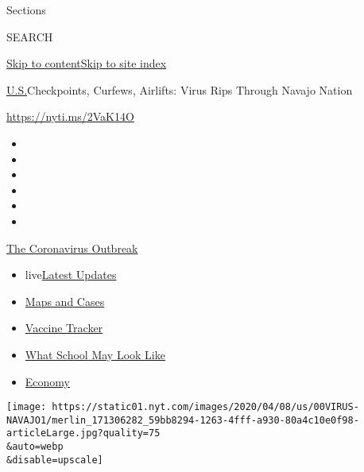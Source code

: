 Sections

SEARCH

\protect\hyperlink{site-content}{Skip to
content}\protect\hyperlink{site-index}{Skip to site index}

\href{/section/us}{U.S.}\textbar{}Checkpoints, Curfews, Airlifts: Virus
Rips Through Navajo Nation

\url{https://nyti.ms/2VaK14O}

\begin{itemize}
\item
\item
\item
\item
\item
\item
\end{itemize}

\href{https://www.nytimes.com/news-event/coronavirus?action=click\&pgtype=Article\&state=default\&region=TOP_BANNER\&context=storylines_menu}{The
Coronavirus Outbreak}

\begin{itemize}
\tightlist
\item
  live\href{https://www.nytimes.com/2020/08/01/world/coronavirus-covid-19.html?action=click\&pgtype=Article\&state=default\&region=TOP_BANNER\&context=storylines_menu}{Latest
  Updates}
\item
  \href{https://www.nytimes.com/interactive/2020/us/coronavirus-us-cases.html?action=click\&pgtype=Article\&state=default\&region=TOP_BANNER\&context=storylines_menu}{Maps
  and Cases}
\item
  \href{https://www.nytimes.com/interactive/2020/science/coronavirus-vaccine-tracker.html?action=click\&pgtype=Article\&state=default\&region=TOP_BANNER\&context=storylines_menu}{Vaccine
  Tracker}
\item
  \href{https://www.nytimes.com/interactive/2020/07/29/us/schools-reopening-coronavirus.html?action=click\&pgtype=Article\&state=default\&region=TOP_BANNER\&context=storylines_menu}{What
  School May Look Like}
\item
  \href{https://www.nytimes.com/live/2020/07/31/business/stock-market-today-coronavirus?action=click\&pgtype=Article\&state=default\&region=TOP_BANNER\&context=storylines_menu}{Economy}
\end{itemize}

\texttt{[image: https://static01.nyt.com/images/2020/04/08/us/00VIRUS-NAVAJO1/merlin\_171306282\_59bb8294-1263-4fff-a930-80a4c10e0f98-articleLarge.jpg?quality=75\\\&auto=webp\\\&disable=upscale]}

